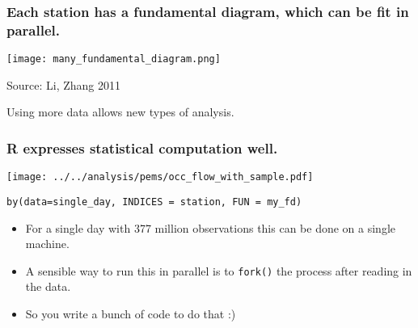 \documentclass{beamer}
\begin{document}
\begin{frame}

    \frametitle{Each station has a fundamental diagram, which can be fit in
    parallel.}


\centerline{\texttt{[image: many\_fundamental\_diagram.png]}}

Source: Li, Zhang 2011

Using more data allows new types of analysis.

\end{frame}
\begin{frame}[fragile]

    \frametitle{R expresses statistical computation well.}


    \centerline{\texttt{[image: ../../analysis/pems/occ\_flow\_with\_sample.pdf]}}

\begin{verbatim}
by(data=single_day, INDICES = station, FUN = my_fd)
\end{verbatim}

    \pause

    \begin{itemize}
        \item For a single day with 377 million observations this can be
            done on a single machine.
        \item A sensible way to run this in parallel is to \texttt{fork()}
            the process after reading in the data.
        \item So you write a bunch of code to do that :)
    \end{itemize}

\end{frame}
\end{document}
